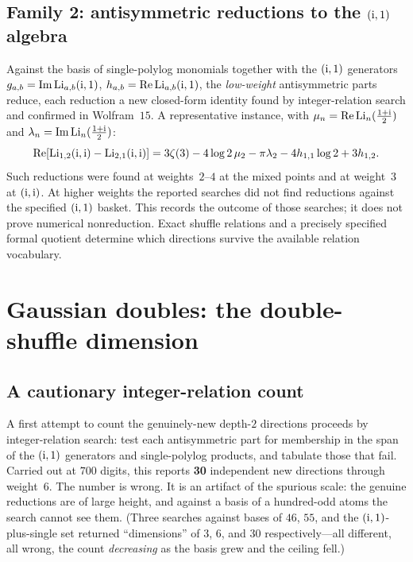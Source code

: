 \subsection{Family 2: antisymmetric reductions to the $(\mathrm{i},1)$ algebra}

Against the basis of single-polylog monomials together with the $(\mathrm{i},1)$ generators
$g_{a,b}=\operatorname{Im}\operatorname{Li}_{a,b}(\mathrm{i},1)$, $h_{a,b}=\operatorname{Re}\operatorname{Li}_{a,b}(\mathrm{i},1)$, the \emph{low-weight} antisymmetric
parts reduce, each reduction a new closed-form identity found by integer-relation search and confirmed
in Wolfram~$15$. A representative instance, with $\mu_n=\operatorname{Re}\operatorname{Li}_n(\tfrac{1+\mathrm{i}}2)$ and
$\lambda_n=\operatorname{Im}\operatorname{Li}_n(\tfrac{1+\mathrm{i}}2)$:
\begin{equation}\label{double:eq:fam2-example}
  \operatorname{Re}\!\left[\operatorname{Li}_{1,2}(\mathrm{i},\mathrm{i})-\operatorname{Li}_{2,1}(\mathrm{i},\mathrm{i})\right]
  =3\zeta(3)-4\log2\,\mu_2-\pi\lambda_2-4h_{1,1}\log2+3h_{1,2}.
\end{equation}
Such reductions were found at weights~$2$--$4$ at the mixed points and at weight~$3$ at $(\mathrm{i},\mathrm{i})$.
At higher weights the reported searches did not find reductions against the
specified $(\mathrm{i},1)$ basket. This records the outcome of those searches;
it does not prove numerical nonreduction. Exact shuffle relations and a
precisely specified formal quotient determine which directions survive
the available relation vocabulary.

\section{Gaussian doubles: the double-shuffle dimension}\label{double:sec:gauss-frontier}

\subsection{A cautionary integer-relation count}

A first attempt to count the genuinely-new depth-$2$ directions proceeds by integer-relation search:
test each antisymmetric part for membership in the span of the $(\mathrm{i},1)$ generators and single-polylog
products, and tabulate those that fail. Carried out at $700$ digits, this reports \textbf{30}
independent new directions through weight~$6$. The number is wrong. It is an artifact of the spurious
scale: the genuine reductions are of large height, and against a basis of a hundred-odd atoms the
search cannot see them. (Three searches against bases of $46$, $55$, and the $(\mathrm{i},1)$-plus-single set
returned ``dimensions'' of $3$, $6$, and $30$ respectively---all different, all wrong, the count
\emph{decreasing} as the basis grew and the ceiling fell.)

